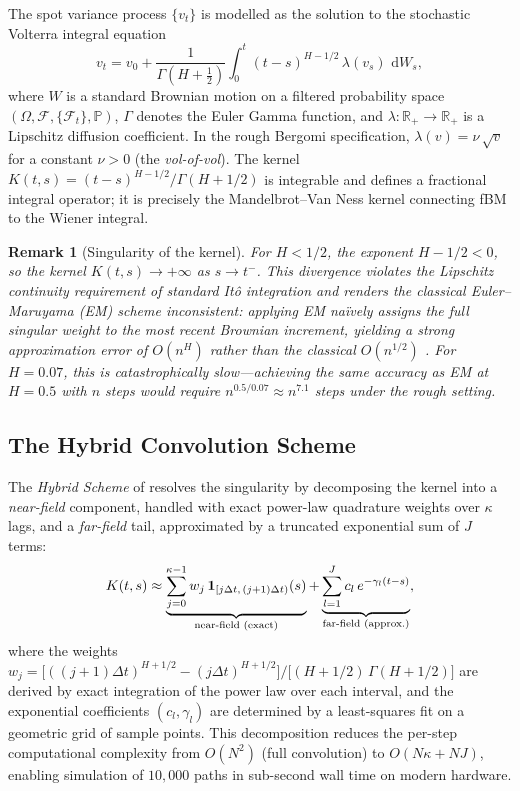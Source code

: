\documentclass[conference]{IEEEtran}
\newtheorem{remark}{Remark}
\newcommand{\R}{\mathbb{R}}
\newcommand{\Prob}{\mathbb{P}}
\newcommand{\F}{\mathcal{F}}
\newcommand{\G}{\Gamma}
\newcommand{\dd}{\mathrm{d}}
\newcommand{\dW}{\,\dd W}
\begin{document}
The spot variance process $\{v_t\}$ is modelled as the solution to
the stochastic Volterra integral equation
\begin{equation}\label{eq:volterra}
  v_t = v_0 + \frac{1}{\Gamma\!\left(H + \tfrac{1}{2}\right)}
        \int_0^t (t-s)^{H - 1/2}\, \lambda(v_s)\, \dW_s,
\end{equation}
where $W$ is a standard Brownian motion on a filtered probability
space $(\Omega, \F, \{\F_t\}, \Prob)$, $\G$ denotes the Euler Gamma
function, and $\lambda : \R_+ \to \R_+$ is a Lipschitz diffusion
coefficient.  In the rough Bergomi specification,
$\lambda(v) = \nu\,\sqrt{v}$ for a constant $\nu > 0$ (the
\emph{vol-of-vol}).  The kernel $K(t,s) = (t-s)^{H-1/2}/\G(H+1/2)$
is integrable and defines a fractional integral operator; it is
precisely the Mandelbrot--Van Ness kernel connecting fBM to the
Wiener integral.

\begin{remark}[Singularity of the kernel]\label{rem:singular}
For $H < 1/2$, the exponent $H - 1/2 < 0$, so the kernel
$K(t,s) \to +\infty$ as $s \to t^-$.  This divergence violates the
Lipschitz continuity requirement of standard It\^{o} integration and
renders the classical Euler--Maruyama (EM) scheme inconsistent:
applying EM na\"ively assigns the full singular weight to the most
recent Brownian increment, yielding a strong approximation error of
$O(n^H)$ rather than the classical $O(n^{1/2})$
\cite{richard2021discretisation}.  For $H = 0.07$, this is
catastrophically slow—achieving the same accuracy as EM at $H = 0.5$
with $n$ steps would require $n^{0.5/0.07} \approx n^{7.1}$ steps
under the rough setting.
\end{remark}

\subsection{The Hybrid Convolution Scheme}

The \emph{Hybrid Scheme} of \citeauthor{bennedsen2017hybrid}
\cite{bennedsen2017hybrid} resolves the singularity by decomposing the
kernel into a \emph{near-field} component, handled with exact
power-law quadrature weights over $\kappa$ lags, and a
\emph{far-field} tail, approximated by a truncated exponential sum of
$J$ terms:
\begin{equation}\label{eq:hybrid}
  K(t,s) \approx \underbrace{\sum_{j=0}^{\kappa-1} w_j
                 \,\mathbf{1}_{[j\Delta t,\,(j+1)\Delta t)}(s)}_{%
                 \text{near-field (exact)}}
               + \underbrace{\sum_{l=1}^{J} c_l\,
                 e^{-\gamma_l(t-s)}}_{\text{far-field (approx.)}},
\end{equation}
where the weights $w_j = \bigl[((j+1)\Delta t)^{H+1/2} -
(j\Delta t)^{H+1/2}\bigr] / \bigl[(H+1/2)\,\G(H+1/2)\bigr]$ are
derived by exact integration of the power law over each interval, and
the exponential coefficients $(c_l, \gamma_l)$ are determined by a
least-squares fit on a geometric grid of sample points.  This
decomposition reduces the per-step computational complexity from
$O(N^2)$ (full convolution) to $O(N\kappa + NJ)$, enabling
simulation of $10{,}000$ paths in sub-second wall time on modern
hardware.
\end{document}
